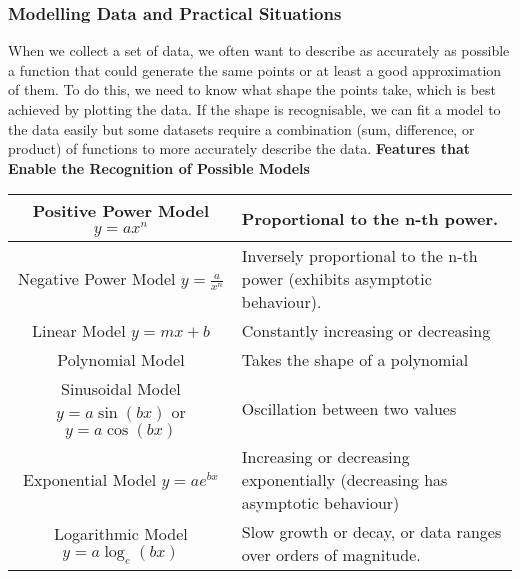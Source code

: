 \documentclass{article}
\begin{document}
			\subsubsection{Modelling Data and Practical Situations}
				When we collect a set of data, we often want to describe as accurately as possible a function that could generate the same points or at least a good approximation of them. To do this, we need to know what shape the points take, which is best achieved by plotting the data. If the shape is recognisable, we can fit a model to the data easily but some datasets require a combination (sum, difference, or product) of functions to more accurately describe the data.
				\newline\newline
				\textbf{Features that Enable the Recognition of Possible Models}\newline
				\bgroup
				\def\arraystretch{2}
				\begin{tabular}{|c|m{10cm}|}
					\hline
					Positive Power Model $y=ax^n$ & Proportional to the n-th power. \\
					\hline
					Negative Power Model $y=\frac{a}{x^n}$ & Inversely proportional to the n-th power (exhibits asymptotic behaviour). \\
					\hline
					Linear Model $y=mx+b$ & Constantly increasing or decreasing \\
					\hline
					Polynomial Model & Takes the shape of a polynomial \\
					\hline
					\makecell{Sinusoidal Model \\ $y=a\sin(bx)$ or $y=a\cos(bx)$} & Oscillation between two values \\
					\hline
					\makecell{Exponential Model \\ $y=ae^{bx}$} & Increasing or decreasing exponentially (decreasing has asymptotic behaviour) \\
					\hline
					\makecell{Logarithmic Model \\ $y=a\log_e(bx)$} & Slow growth or decay, or data ranges over orders of magnitude. \\
					\hline
				\end{tabular}
				\egroup
\end{document}
